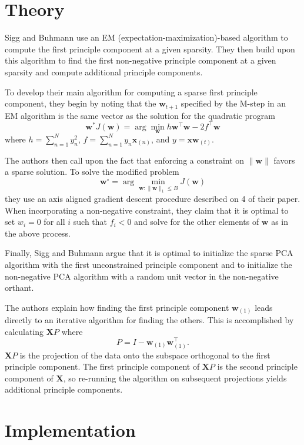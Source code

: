 \documentclass{article}
\begin{document}
\section{Theory}

Sigg and Buhmann use an EM (expectation-maximization)-based algorithm
to compute the first principle component at a given sparsity.
They then build upon this algorithm to find the first non-negative
principle component at a given sparsity and compute additional
principle components.

To develop their main algorithm for computing a sparse first principle
component, they begin by noting that the $\mathbf{w}_{t+1}$
specified by the M-step in an EM algorithm is the same vector as the
solution for the quadratic program
\[
\mathbf{w}^* J(\mathbf{w}) =
\arg\min_{\mathbf{w}} h \mathbf{w}^\intercal \mathbf{w}
  - 2 f^\intercal \mathbf{w}
\]
where $h = \sum_{n=1}^N y_n^2$, $f = \sum_{n=1}^N y_n \mathbf{x}_{(n)}$,
and $y = \mathbf{x} \mathbf{w}_{(t)}$.

The authors then call upon the fact that enforcing a constraint
on $\|\mathbf{w}\|$ favors a sparse solution.
To solve the modified problem
\[
\mathbf{w}^\circ = \arg\min_{
  \mathbf
{w} : \|\mathbf
{w}\|_1 \le B
} J(\mathbf{w})
\]
they use an axis aligned gradient descent procedure
described on 4 of their paper.
When incorporating a non-negative constraint, they claim that it is
optimal to set $w_i = 0$ for all $i$ such that $f_i < 0$
and solve for the other elements of $\mathbf{w}$ as in the above process.

Finally, Sigg and Buhmann argue that it is optimal to initialize
the sparse PCA algorithm with the first unconstrained principle component
and to initialize the non-negative PCA algorithm with a random unit vector
in the non-negative orthant.

The authors explain how finding the first principle component
$\mathbf{w}_{(1)}$ leads directly to an iterative algorithm
for finding the others.
This is accomplished by calculating $\mathbf{X} P$
where \[ P = I - \mathbf{w}_{(1)} \mathbf{w}_{(1)}^\intercal \textrm{.} \]
$\mathbf{X}P$ is the projection of the data onto the subspace orthogonal
to the first principle component.
The first principle component of $\mathbf{X} P$ is the second
principle component of $\mathbf{X}$, so re-running the algorithm
on subsequent projections yields additional principle components.

\section{Implementation}
\end{document}

